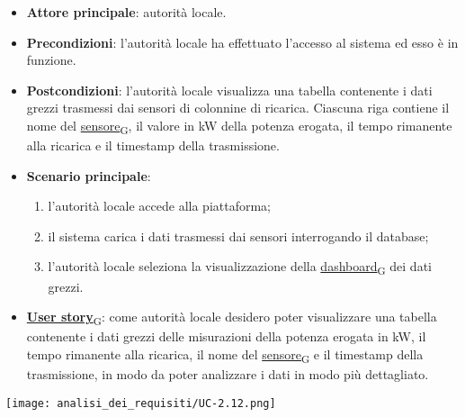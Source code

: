 \newpage
{}
\begin{itemize}
	\item \textbf{Attore principale}: autorità locale.
	\item \textbf{Precondizioni}: l'autorità locale ha effettuato l'accesso al sistema ed esso è in funzione.
	\item \textbf{Postcondizioni}: l'autorità locale visualizza una tabella contenente i dati grezzi trasmessi dai sensori di colonnine di ricarica.
	      Ciascuna riga contiene il nome del \href{https://7last.github.io/docs/pb/documentazione-interna/glossario\#sensore}{sensore\textsubscript{G}}, il valore in kW della potenza erogata, il tempo rimanente alla ricarica e il timestamp della trasmissione.
	\item \textbf{Scenario principale}:
	      \begin{enumerate}
		      \item l'autorità locale accede alla piattaforma;
		      \item il sistema carica i dati trasmessi dai sensori interrogando il database;
		      \item l'autorità locale seleziona la visualizzazione della \href{https://7last.github.io/docs/pb/documentazione-interna/glossario\#dashboard}{dashboard\textsubscript{G}} dei dati grezzi.
	      \end{enumerate}
	\item \href{https://7last.github.io/docs/pb/documentazione-interna/glossario\#user-story}{\textbf{User story}\textsubscript{G}}:
	      come autorità locale desidero poter visualizzare una tabella contenente i dati grezzi delle misurazioni della potenza erogata in kW,
	      il tempo rimanente alla ricarica, il nome del \href{https://7last.github.io/docs/pb/documentazione-interna/glossario\#sensore}{sensore\textsubscript{G}} e il timestamp della trasmissione, in modo da poter analizzare i dati in modo più dettagliato.
\end{itemize}
\begin{center}
	\texttt{[image: analisi\_dei\_requisiti/UC-2.12.png]}
\end{center}

